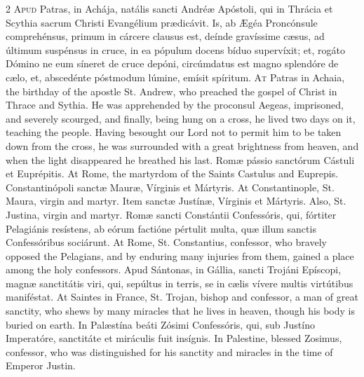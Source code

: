 \begin{paracol}{2}
\lettrine[lines=2]{A}{pud} Patras, in Achája, 
 natális sancti Andréæ Apóstoli, qui in Thrácia et Scythia sacrum Christi 
 Evangélium prædicávit. Is, ab Ægéa Proncónsule comprehénsus, primum in cárcere clausus est, deínde gravíssime cæsus, ad 
 últimum suspénsus in cruce, 
 in ea pópulum docens bíduo supervíxit; et, rogáto Dómino ne eum síneret de 
 cruce depóni, circúmdatus est magno splendóre de cælo, et, abscedénte 
 póstmodum lúmine, emísit spíritum.
\switchcolumn
{}
\lettrine[lines=2]{A}{t} Patras in Achaia, the birthday of 
 the apostle St. Andrew, who preached the gospel of Christ in Thrace and 
 Sythia. He was apprehended by the proconsul Aegeas, imprisoned, and 
 severely scourged, and finally, being hung on a cross, he lived two days on 
 it, teaching the people. Having besought our Lord not to permit him to 
 be taken down from the cross, he was surrounded with a great brightness from 
 heaven, and when the light disappeared he breathed his last.
\switchcolumn*
{}
Romæ pássio sanctórum 
 Cástuli et Euprépitis.
\switchcolumn
{}
At Rome, the martyrdom of the Saints 
 Castulus and Euprepis.
\switchcolumn*
{}
Constantinópoli sanctæ 
 Mauræ, Vírginis et Mártyris.
\switchcolumn
{}
At Constantinople, St. Maura, virgin 
 and martyr.
\switchcolumn*
{}
Item sanctæ Justínæ, 
 Vírginis et Mártyris.
\switchcolumn
{}
Also, St. Justina, virgin and 
 martyr.
\switchcolumn*
{}
Romæ sancti Constántii 
 Confessóris, qui, fórtiter Pelagiánis resístens, ab eórum factióne pértulit 
 multa, quæ illum sanctis Confessóribus sociárunt.
\switchcolumn
{}
At Rome, St. Constantius, confessor, 
 who bravely opposed the Pelagians, and by enduring many injuries from them, 
 gained a place among the holy confessors.
\switchcolumn*
{}
Apud Sántonas, in 
 Gállia, sancti Trojáni Epíscopi, magnæ sanctitátis viri, qui, sepúltus in 
 terris, se in cælis vívere multis virtútibus maniféstat.
\switchcolumn
{}
At Saintes in France, St. Trojan, 
 bishop and confessor, a man of great sanctity, who shews by many miracles 
 that he lives in heaven, though his body is buried on earth.
\switchcolumn*
{}
In Palæstína beáti 
 Zósimi Confessóris, qui, sub Justíno Imperatóre, sanctitáte et miráculis 
 fuit insígnis.
\switchcolumn
{}
In Palestine, blessed Zosimus, 
 confessor, who was distinguished for his sanctity and miracles in the time 
 of Emperor Justin.
\switchcolumn*
{}
\end{paracol}
